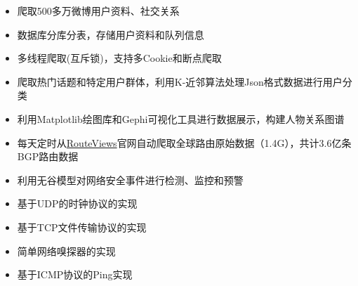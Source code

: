\documentclass{resume}
\begin{document}
    \begin{onehalfspacing}
        \begin{itemize}
            \item 爬取500多万微博用户资料、社交关系
            \item 数据库分库分表，存储用户资料和队列信息
            \item 多线程爬取(互斥锁)，支持多Cookie和断点爬取
            \item 爬取热门话题和特定用户群体，利用K-近邻算法处理Json格式数据进行用户分类
            \item 利用Matplotlib绘图库和Gephi可视化工具进行数据展示，构建人物关系图谱
        \end{itemize}
    \end{onehalfspacing}
    \hwj{ }

    \begin{onehalfspacing}
        \begin{itemize}
            \item 每天定时从\href{http://www.routeviews.org}{RouteViews}官网自动爬取全球路由原始数据（1.4G），共计3.6亿条BGP路由数据
            \item 利用无谷模型对网络安全事件进行检测、监控和预警
        \end{itemize}
    \end{onehalfspacing}
    \hwj{ }

    \begin{onehalfspacing}
        \begin{itemize}
            \item 基于UDP的时钟协议的实现
            \item 基于TCP文件传输协议的实现
            \item 简单网络嗅探器的实现
            \item 基于ICMP协议的Ping实现
        \end{itemize}
    \end{onehalfspacing}
    \hwj{ }
\end{document}
